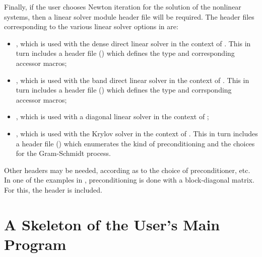 Finally, if the user chooses Newton iteration for the solution of the nonlinear systems,
then a linear solver module header file will be required. 
The header files corresponding to the various linear solver options in {\cvodes} are:
%
\begin{itemize}
\item {}, 
  which is used with the dense direct linear solver in 
  the context of {\cvodes}. This in turn includes a header file ()
  which defines the  type and corresponding accessor macros; 
\item {}, 
  which is used with the band direct linear solver in the
  context of {\cvodes}. This in turn includes a header file ()
  which defines the  type and corrsponding accessor macros;
\item {}, which is used with a diagonal linear solver in the
  context of {\cvodes};
\item {}, 
  which is used with the Krylov solver {\spgmr} in the
  context of {\cvodes}. This in turn includes a header file ()
  which enumerates the kind of preconditioning and the choices for the
  Gram-Schmidt process.
\end{itemize}

Other headers may be needed, according as to the choice of
preconditioner, etc. In one of the examples in \cite{}, preconditioning
is done with a block-diagonal matrix. For this, the header
 is included.


\section{A Skeleton of the User's Main Program}\label{ss:skeleton_sim}

